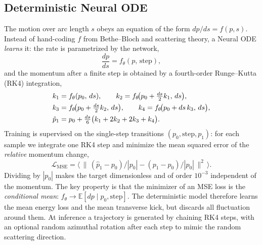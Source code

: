 \documentclass[11pt]{article}
\begin{document}
\subsection{Deterministic Neural ODE}
The motion over arc length $s$ obeys an equation of the form $dp/ds=f(p,s)$.
Instead of hand-coding $f$ from Bethe--Bloch and scattering theory, a Neural ODE
\cite{neuralode} \emph{learns} it: the rate is parametrized by the network,
\begin{equation}
  \frac{dp}{ds}=f_\theta(p,\,\mathrm{step}),
  \label{eq:node}
\end{equation}
and the momentum after a finite step is obtained by a fourth-order Runge--Kutta
(RK4) integration,
\begin{align}
  k_1 &= f_\theta(p_0,\,ds), \qquad
  k_2 = f_\theta\!\big(p_0+\tfrac{ds}{2}k_1,\,ds\big), \notag\\
  k_3 &= f_\theta\!\big(p_0+\tfrac{ds}{2}k_2,\,ds\big), \qquad
  k_4 = f_\theta\!\big(p_0+ds\,k_3,\,ds\big), \notag\\
  \hat p_1 &= p_0 + \tfrac{ds}{6}\big(k_1+2k_2+2k_3+k_4\big).
  \label{eq:rk4}
\end{align}
Training is supervised on the single-step transitions $(p_0,\mathrm{step},p_1)$:
for each sample we integrate one RK4 step and minimize the mean squared error of
the \emph{relative} momentum change,
\begin{equation}
  \mathcal{L}_{\mathrm{MSE}}
  = \Big\langle\, \big\|\,(\hat p_1-p_0)/|p_0| - (p_1-p_0)/|p_0|\,\big\|^2 \,\Big\rangle .
  \label{eq:mse}
\end{equation}
Dividing by $|p_0|$ makes the target dimensionless and of order $10^{-3}$
independent of the momentum. The key property is that the minimizer of an MSE
loss is the \emph{conditional mean}: $f_\theta\to\mathbb{E}[dp\mid p_0,
\mathrm{step}]$. The deterministic model therefore learns the mean energy loss
and the mean transverse kick, but discards all fluctuation around them. At
inference a trajectory is generated by chaining RK4 steps, with an optional
random azimuthal rotation after each step to mimic the random scattering
direction.
\end{document}
